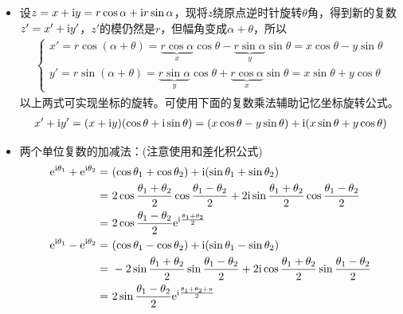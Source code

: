 \begin{itemize}[leftmargin=\inteval{\myitemleftmargin}pt,itemsep=
   \inteval{\myitemitempsep}pt,topsep=\inteval{\myitemtopsep}pt]
\item 设$ z=x+\mathrm{i} y=r\cos \alpha+\mathrm{i} r\sin \alpha $，现将$ z $绕原点逆时针旋转$ \theta $角，得到新的复数$ z'=x'+\mathrm{i} y' $，$ z' $的模仍然是$ r $，但幅角变成$ \alpha+\theta $，所以
\begin{gather}\label{坐标旋转公式}
\begin{cases}
    x'=r\cos (\alpha+\theta)=\underbrace{r\cos\alpha}_{x}
    \cos\theta-	\underbrace{r\sin\alpha}_{y}\sin\theta	
    =x\cos\theta-y\sin\theta  \\
    y'=r\sin (\alpha+\theta)=\underbrace{r\sin\alpha}_{y}
    \cos\theta+\underbrace{r\cos\alpha}_{x}\sin\theta
    =x\sin\theta+y\cos\theta
\end{cases} 
\end{gather}
以上两式可实现坐标的旋转。可使用下面的复数乘法辅助记忆坐标旋转公式。
\begin{gather*}
x'+\mathrm{i} y'=(x+\mathrm{i} y)(\cos\theta +\mathrm{i}\sin\theta)
=(x\cos\theta-y\sin\theta)+\mathrm{i}(x\sin\theta+y\cos\theta)
\end{gather*} 
\item 两个单位复数的加减法：(注意使用和差化积公式)
\begin{align*}
    \e^{\i\theta_1}+\e^{\i\theta_2}=&\ (\cos\theta_1+\cos\theta_2)+\i(\sin\theta_1+\sin\theta_2)\\
    =&\ 2\cos\dfrac{\theta_1+\theta_2}{2}\cos\dfrac{\theta_1-\theta_2}{2}+
    2\i\sin\dfrac{\theta_1+\theta_2}{2}\cos\dfrac{\theta_1-\theta_2}{2} \\
    =&\ 2\cos\dfrac{\theta_1-\theta_2}{2}\e^{\i\frac{\theta_1+\theta_2}{2}}  \\
    \e^{\i\theta_1}-\e^{\i\theta_2}=&\ (\cos\theta_1-\cos\theta_2)+\i(\sin\theta_1-\sin\theta_2)\\
    =&\ -2\sin\dfrac{\theta_1+\theta_2}{2}\sin\dfrac{\theta_1-\theta_2}{2}+
    2\i\cos\dfrac{\theta_1+\theta_2}{2}\sin\dfrac{\theta_1-\theta_2}{2} \\
    =&\ 2\sin\dfrac{\theta_1-\theta_2}{2}\e^{\i\frac{\theta_1+\theta_2+\pi}{2}}  
\end{align*}

\end{itemize}

